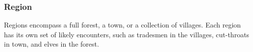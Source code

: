 \begin{multicols}{2}
\subsubsection{Region}

Regions encompass a full forest, a town, or a collection of \glspl{village}.
Each region has its own set of likely encounters, such as tradesmen in the \glspl{village}, cut-throats in town, and elves in the forest.

\end{multicols}

